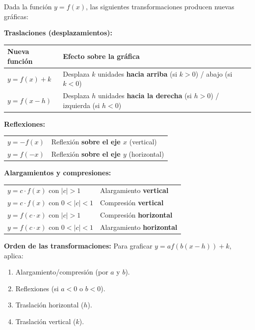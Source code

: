 \documentclass[12pt, letterpaper]{article}
\begin{document}
\begin{cuadroteoria}
  Dada la función $y = f(x)$, las siguientes transformaciones producen nuevas gráficas:

  \textbf{Traslaciones (desplazamientos):}
  \begin{center}
    \begin{tabular}{l p{7.8cm}}
      \toprule
      \textbf{Nueva función} & \textbf{Efecto sobre la gráfica}                                                      \\
      \midrule
      $y = f(x) + k$         & Desplaza $k$ unidades \textbf{hacia arriba} (si $k > 0$) / abajo (si $k < 0$)         \\
      $y = f(x - h)$         & Desplaza $h$ unidades \textbf{hacia la derecha} (si $h > 0$) / izquierda (si $h < 0$) \\
      \bottomrule
    \end{tabular}
  \end{center}

  \textbf{Reflexiones:}
  \begin{center}
    \begin{tabular}{ll}
      \toprule
      $y = -f(x)$ & Reflexión \textbf{sobre el eje $x$} (vertical)   \\
      $y = f(-x)$ & Reflexión \textbf{sobre el eje $y$} (horizontal) \\
      \bottomrule
    \end{tabular}
  \end{center}

  \textbf{Alargamientos y compresiones:}
  \begin{center}
    \begin{tabular}{ll}
      \toprule
      $y = c \cdot f(x)$ con $|c| > 1$     & Alargamiento \textbf{vertical}   \\
      $y = c \cdot f(x)$ con $0 < |c| < 1$ & Compresión \textbf{vertical}     \\
      $y = f(c \cdot x)$ con $|c| > 1$     & Compresión \textbf{horizontal}   \\
      $y = f(c \cdot x)$ con $0 < |c| < 1$ & Alargamiento \textbf{horizontal} \\
      \bottomrule
    \end{tabular}
  \end{center}
\end{cuadroteoria}

\begin{cuadroadvertencia}
  \textbf{Orden de las transformaciones:} Para graficar $y = af\left(b(x - h)\right) + k$, aplica:
  \begin{enumerate}
    \item Alargamiento/compresión (por $a$ y $b$).
    \item Reflexiones (si $a < 0$ o $b < 0$).
    \item Traslación horizontal ($h$).
    \item Traslación vertical ($k$).
  \end{enumerate}
\end{cuadroadvertencia}
\end{document}
